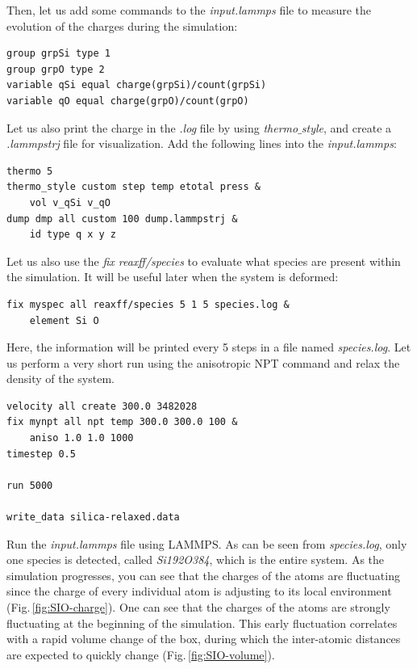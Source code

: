 \documentclass[9pt,tutorial]{livecoms}
\begin{document}
Then, let us add some commands to the \textit{input.lammps} file  to measure the evolution of the charges during the simulation:
{\normalsize \begin{verbatim}
group grpSi type 1
group grpO type 2
variable qSi equal charge(grpSi)/count(grpSi)
variable qO equal charge(grpO)/count(grpO)
\end{verbatim}}
Let us also print the charge in the \textit{.log} file by using \textit{thermo$\_$style}, and create a \textit{.lammpstrj} file for visualization. Add the following lines into the \textit{input.lammps}:
{\normalsize \begin{verbatim}
thermo 5
thermo_style custom step temp etotal press &
    vol v_qSi v_qO
dump dmp all custom 100 dump.lammpstrj &
    id type q x y z
\end{verbatim}}
Let us also use the \textit{fix reaxff/species} to evaluate what species are present within the simulation. It will
be useful later when the system is deformed:
{\normalsize \begin{verbatim}
fix myspec all reaxff/species 5 1 5 species.log &
    element Si O
\end{verbatim}}
Here, the information will be printed every 5 steps in a file named \textit{species.log}.
Let us perform a very short run using the anisotropic NPT command and relax the density of the system. 
{\normalsize \begin{verbatim}
velocity all create 300.0 3482028
fix mynpt all npt temp 300.0 300.0 100 &
    aniso 1.0 1.0 1000
timestep 0.5

run 5000

write_data silica-relaxed.data
\end{verbatim}}
Run the \textit{input.lammps} file using LAMMPS. As can be seen from \textit{species.log}, only one species is detected, called \textit{Si192O384}, which is the entire system. As the simulation progresses, you can see that the charges of the atoms are fluctuating since the charge of every individual atom is adjusting to its local environment (Fig.\,\ref{fig:SIO-charge}). One can see that the charges of the atoms are strongly fluctuating at the beginning of the simulation. This early fluctuation correlates with a rapid volume change of the box, during which the inter-atomic distances are expected to quickly change (Fig.\,\ref{fig:SIO-volume}).
\end{document}
